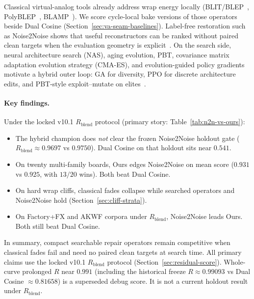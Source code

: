 Classical virtual-analog tools already address wrap energy locally
(BLIT/BLEP~\cite{stilson1996}, PolyBLEP~\cite{nam2009polyblep}, BLAMP~\cite{esqueda2016blamp}).
We score cycle-local bake versions of those operators beside Dual Cosine (Section~\ref{sec:va-seam-baselines}).
Label-free restoration such as Noise2Noise shows that useful reconstructors can be ranked without paired clean targets when the evaluation geometry is explicit~\cite{lehtinen2018,kashyap2021n2n}.
On the search side, neural architecture search (NAS), aging evolution, PBT, covariance matrix adaptation evolution strategy (CMA-ES), and evolution-guided policy gradients motivate a hybrid outer loop: GA for diversity, PPO for discrete architecture edits, and PBT-style exploit--mutate on elites~\cite{elsken2019,real2019,jaderberg2017,schulman2017,khadka2018}.

\paragraph{Key findings.}
Under the locked v10.1 $R_{\mathrm{blend}}$ protocol (primary story: Table~\ref{tab:n2n-vs-ours}):
\begin{itemize}
  \item The hybrid champion does \emph{not} clear the frozen Noise2Noise holdout gate
    ($R_{\mathrm{blend}}{\approx}0.9697$ vs $0.9750$). Dual Cosine on that holdout sits near $0.541$.
  \item On twenty multi-family boards, Ours edges Noise2Noise on mean score ($0.931$ vs $0.925$, with $13/20$ wins). Both beat Dual Cosine.
  \item On hard wrap cliffs, classical fades collapse while searched operators and Noise2Noise hold (Section~\ref{sec:cliff-strata}).
  \item On Factory+FX and AKWF corpora under $R_{\mathrm{blend}}$, Noise2Noise leads Ours. Both still beat Dual Cosine.
\end{itemize}
In summary, compact searchable repair operators remain competitive when classical fades fail and need no paired clean targets at search time.
All primary claims use the locked v10.1 $R_{\mathrm{blend}}$ protocol (Section~\ref{sec:residual-score}).
Whole-curve prolonged $R$ near $0.991$ (including the historical freeze $R{\approx}0.99093$ vs Dual Cosine ${\approx}0.81658$) is a superseded debug score.
It is not a current holdout result under $R_{\mathrm{blend}}$.

